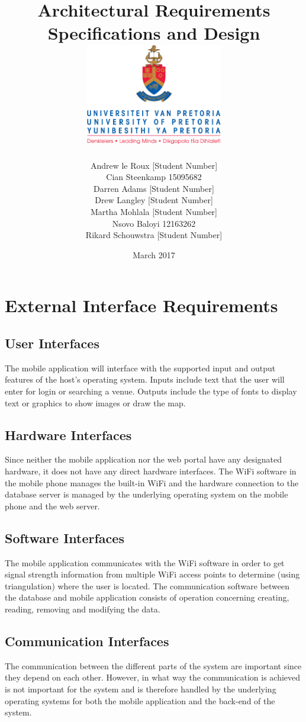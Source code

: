 \documentclass{article}
\title{ Architectural Requirements Specifications and Design \\[0.5cm] \includegraphics[width=6cm]{front-page}}
\author{Andrew le Roux \hfill [Student Number] \\ Cian Steenkamp \hfill 15095682 \\ Darren Adams \hfill [Student Number] \\ Drew Langley \hfill [Student Number] \\ Martha Mohlala \hfill [Student Number] \\ Nsovo Baloyi \hfill 12163262 \\ Rikard Schouwstra \hfill [Student Number]}
\date{March 2017}
\begin{document}
\maketitle
\pagebreak
\tableofcontents
\pagebreak

\section{External Interface Requirements}
    \subsection{User Interfaces}
        The mobile application will interface with the supported input and output
        features of the host's operating system. Inputs include text that the user
        will enter for login or searching a venue. Outputs include the type of fonts
        to display text or graphics to show images or draw the map.

    \subsection{Hardware Interfaces}
        Since neither the mobile application nor the web portal have any designated
        hardware, it does not have any direct hardware interfaces. The WiFi software
        in the mobile phone manages the built-in WiFi and the hardware connection
        to the database server is managed by the underlying operating system on the
        mobile phone and the web server.

    \subsection{Software Interfaces}
        The mobile application communicates with the WiFi software in order to get
        signal strength information from multiple WiFi access points to determine
        (using triangulation) where the user is located. The communication software
        between the database and mobile application consists of operation concerning
        creating, reading, removing and modifying the data.

    \subsection{Communication Interfaces}
        The communication between the different parts of the system are important since they depend on each other. However, in what way the communication is achieved is not important for the system and is therefore handled by the underlying operating systems for both the mobile application and the back-end of the system.
\end{document}
